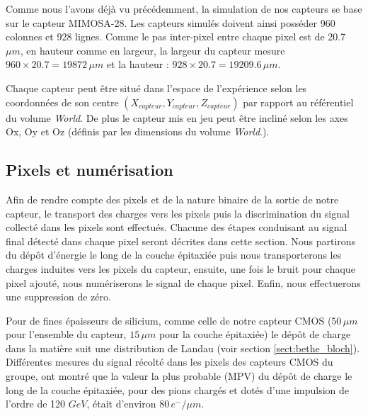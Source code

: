     \medskip
    
    Comme nous l'avons d\'ej\`a vu pr\'ec\'edemment, la simulation de nos capteurs se base sur le capteur MIMOSA-28. Les capteurs simul\'es doivent ainsi poss\'eder 960 colonnes et 928 lignes. Comme le pas inter-pixel entre chaque pixel est de 20.7 $\mu m$, en hauteur comme en largeur, la largeur du capteur mesure $960 \times 20.7 = 19872 \, \mu m$ et la hauteur : $928 \times 20.7 = 19209.6 \,\mu m$.
    
    \medskip
    
    Chaque capteur peut être situ\'e dans l'espace de l'exp\'erience selon les coordonn\'ees de son centre $(X_{capteur}, Y_{capteur}, Z_{capteur})$ par rapport au r\'ef\'erentiel du volume \textit{World}. De plus le capteur mis en jeu peut être inclin\'e selon les axes Ox, Oy et Oz (d\'efinis par les dimensions du volume \textit{World}.). 
    
    
  \subsection{Pixels et num\'erisation}
  
  Afin de rendre compte des pixels et de la nature binaire de la sortie de notre capteur, le transport des charges vers les pixels puis la discrimination du signal collect\'e dans les pixels sont effectu\'es. Chacune des \'etapes conduisant au signal final d\'etecté dans chaque pixel seront d\'ecrites dans cette section. Nous partirons du d\'epôt d'\'energie le long de la couche épitaxiée puis nous transporterons les charges induites vers les pixels du capteur, ensuite, une fois le bruit pour chaque pixel ajout\'e, nous numériserons le signal de chaque pixel. Enfin, nous effectuerons une suppression de z\'ero.
   
   \medskip

   Pour de fines \'epaisseurs de silicium, comme celle de notre capteur CMOS ($50 \, \mu m$ pour l'ensemble du capteur, $15 \, \mu m$ pour la couche \'epitaxi\'ee) le d\'epôt de charge dans la mati\`ere suit une distribution de Landau (voir section \ref{sect:bethe_bloch}). Diff\'erentes mesures du signal r\'ecolt\'e dans les pixels des capteurs CMOS du groupe, ont montr\'e que la valeur la plus probable (MPV) du d\'epôt de charge le long de la couche \'epitaxi\'ee, pour des pions charg\'es et dot\'es d'une impulsion de l'ordre de 120 $GeV$, \'etait d'environ $80 \, e^-/\mu m$.  
  
